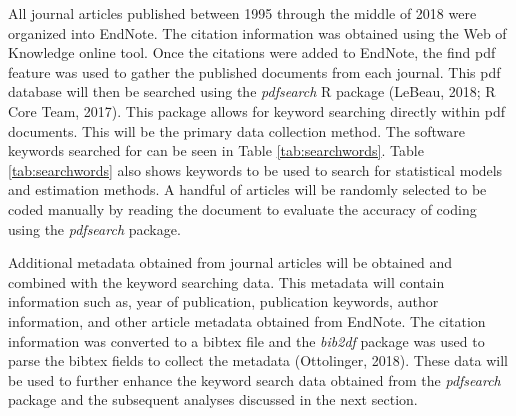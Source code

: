 \documentclass[english,,man]{apa6}
\begin{document}
All journal articles published between 1995 through the middle of 2018 were organized into EndNote. The citation information was obtained using the Web of Knowledge online tool. Once the citations were added to EndNote, the find pdf feature was used to gather the published documents from each journal. This pdf database will then be searched using the \emph{pdfsearch} R package (LeBeau, 2018; R Core Team, 2017). This package allows for keyword searching directly within pdf documents. This will be the primary data collection method. The software keywords searched for can be seen in Table \ref{tab:searchwords}. Table \ref{tab:searchwords} also shows keywords to be used to search for statistical models and estimation methods. A handful of articles will be randomly selected to be coded manually by reading the document to evaluate the accuracy of coding using the \emph{pdfsearch} package.

Additional metadata obtained from journal articles will be obtained and combined with the keyword searching data. This metadata will contain information such as, year of publication, publication keywords, author information, and other article metadata obtained from EndNote. The citation information was converted to a bibtex file and the \emph{bib2df} package was used to parse the bibtex fields to collect the metadata (Ottolinger, 2018). These data will be used to further enhance the keyword search data obtained from the \emph{pdfsearch} package and the subsequent analyses discussed in the next section.
\end{document}
